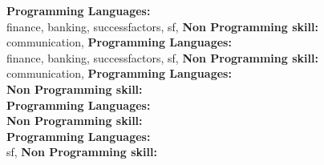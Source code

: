 \textbf{Programming Languages:} \\
finance, banking, successfactors, sf, \textbf{Non Programming skill:} \\
communication, \textbf{Programming Languages:} \\
finance, banking, successfactors, sf, \textbf{Non Programming skill:} \\
communication, \textbf{Programming Languages:} \\
\textbf{Non Programming skill:} \\
\textbf{Programming Languages:} \\
\textbf{Non Programming skill:} \\
\textbf{Programming Languages:} \\
sf, \textbf{Non Programming skill:} \\
